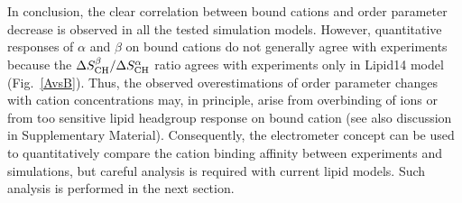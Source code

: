 \documentclass[pre,aps,floatfix,authordate1-4,twocolumn]{revtex4-1}
\begin{document}
In conclusion, the clear correlation between bound cations and order parameter decrease 
is observed in all the tested simulation models. However, quantitative responses of $\alpha$ and $\beta$
on bound cations do not generally agree with experiments because the $\Delta S_{\rm{CH}}^{\beta}/\Delta S_{\rm{CH}}^{\alpha}$ ratio  
agrees with experiments only in Lipid14 model (Fig.~\ref{AvsB}). Thus, the observed 
overestimations of order parameter changes with cation concentrations may, in principle, arise
from overbinding of ions or from too sensitive lipid headgroup response on bound cation 
(see also discussion in Supplementary Material). Consequently, the electrometer concept can be 
used to quantitatively compare the cation binding affinity between experiments and simulations, 
but careful analysis is required with current lipid models. Such analysis is performed in the next section.
\end{document}
